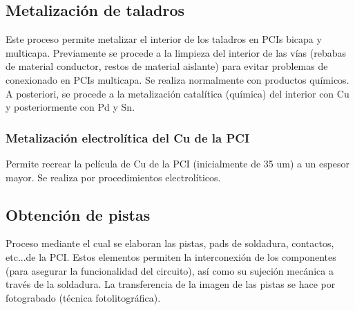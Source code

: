 \subsection{Metalización de taladros}
Este proceso permite metalizar el interior de los taladros en PCIs bicapa y multicapa. Previamente se procede a la limpieza del interior de las vías (rebabas de material conductor, restos de material aislante) para evitar problemas de conexionado en PCIs multicapa. Se realiza normalmente con productos químicos. A posteriori, se procede a la metalización catalítica (química) del interior con Cu y posteriormente con Pd y Sn.

\subsubsection{Metalización electrolítica del Cu de la PCI}
Permite recrear la película de Cu de la PCI (inicialmente de 35 um) a un espesor mayor. Se realiza por procedimientos electrolíticos.

\subsection{Obtención de pistas}
Proceso mediante el cual se elaboran las pistas, pads de soldadura, contactos, etc...de la PCI. Estos elementos permiten la interconexión de los componentes (para asegurar la funcionalidad del circuito), así como su sujeción mecánica a través de la soldadura. La transferencia de la imagen de las pistas se hace por fotograbado (técnica fotolitográfica).

